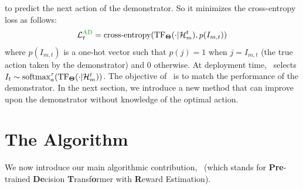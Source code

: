 \documentclass[10pt]{article}
\theoremstyle{plain}
\theoremstyle{definition}
\theoremstyle{remark}
\begin{document}
to predict the next action of the demonstrator. So it
minimizes the cross-entropy loss as follows:
\begin{align}
    \L^{\mathrm{\ad}}_t = \operatorname{cross-entropy}(\T_\bTheta(\cdot|\H_m^t), p({I}_{m,t})) \label{eq:loss-AD}
\end{align}
where  $p({I}_{m,t})$ is a one-hot vector such that $p(j) = 1$ when $j={I}_{m,t}$ (the true action taken by the demonstrator) and $0$ otherwise.
At deployment time, \ad\ selects $I_t \sim \mathrm{softmax}^\tau_a(\mathrm{TF}_{\mathbf{\Theta}}(\cdot|\mathcal{H}^t_m))$.
The objective of \ad\ is to match the performance of the demonstrator.
In the next section, we introduce a new method that can improve upon the demonstrator without knowledge of the optimal action.
\section{The \pred Algorithm}
\label{sec:algo}
We now introduce our main algorithmic contribution, \pred\ (which stands for \textbf{Pre}-trained \textbf{De}cision \textbf{T}ransf\textbf{o}rmer with \textbf{R}eward Estimation).
\vspace*{-0.8em}
\end{document}
